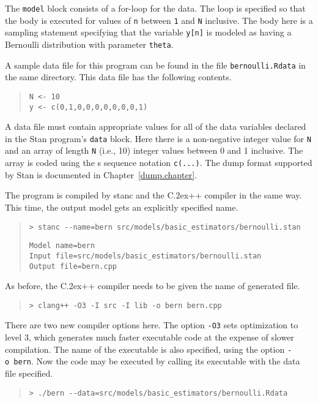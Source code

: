 \documentclass[10pt]{report}
\newcommand{\Stan}{Stan\xspace}
\newcommand{\stanc}{{\ttfamily stanc}\xspace}
\newcommand*{\Cpp}{C\raise.2ex\hbox{\footnotesize ++}\xspace} %
\newcommand{\acronym}[1]{{\sc #1}\xspace}
\newcommand{\SPLUS}{\acronym{s}}
\newcommand{\code}[1]{{\tt #1}}
\newcommand{\refchapter}[1]{Chapter~\ref{#1.chapter}}
\begin{document}
The \code{model} block consists of a for-loop for the data.   The loop is
specified so that the body is executed for values of \code{n} between
\code{1} and \code{N} inclusive.  The body here is a sampling
statement specifying that the variable \code{y[n]} is modeled as
having a Bernoulli distribution with parameter \code{theta}.  

A sample data file for this program can be found in the file
\code{bernoulli.Rdata} in the same directory.  This data file has
the following contents.
%
\begin{quote}
\begin{Verbatim}
N <- 10
y <- c(0,1,0,0,0,0,0,0,0,1)
\end{Verbatim}
\end{quote}
%
A data file must contain appropriate values for all of the data
variables declared in the \Stan program's \code{data} block.  Here there
is a non-negative integer value for \code{N} and an array of length
\code{N} (i.e., 10) integer values between 0 and 1 inclusive.  The
array is coded using the \SPLUS sequence notation \code{c(...)}.
The dump format supported by \Stan is documented in \refchapter{dump}.

The program is compiled by \stanc and the \Cpp compiler in the same
way.  This time, the output model gets an explicitly specified name.
%
%
\begin{quote}
\begin{Verbatim}[fontshape=sl]
> stanc --name=bern src/models/basic_estimators/bernoulli.stan 
\end{Verbatim}
\begin{Verbatim}
Model name=bern
Input file=src/models/basic_estimators/bernoulli.stan
Output file=bern.cpp
\end{Verbatim}
\end{quote}
%
As before, the \Cpp compiler needs to be given the name of
generated file.
%
\begin{quote}
\begin{Verbatim}[fontshape=sl]
> clang++ -O3 -I src -I lib -o bern bern.cpp
\end{Verbatim}
\end{quote}
%
There are two new compiler options here.  The option \code{-O3} sets
optimization to level 3, which generates much faster executable
code at the expense of slower compilation.  The name of the
executable is also specified, using the option \code{-o~bern}.  Now
the code may be executed by calling its executable with the data file
specified. 
%
\begin{quote}
\begin{Verbatim}[fontshape=sl]
> ./bern --data=src/models/basic_estimators/bernoulli.Rdata
\end{Verbatim}
\end{quote}
\end{document}
